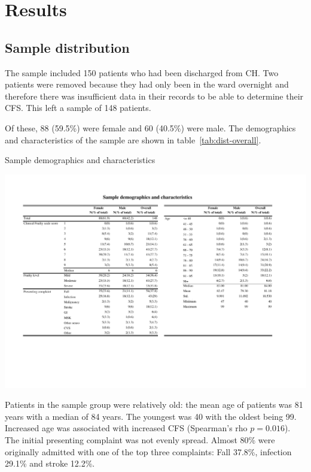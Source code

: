 \documentclass
[
	12pt,
	a4paper,
	oneside,
]{report}
\begin{document}
\chapter{Results}

\section{Sample distribution}

The sample included 150 patients who had been discharged from CH. Two patients
were removed because they had only been in the ward overnight and therefore
there was insufficient data in their records to be able to determine their
CFS. This left a sample of 148 patients. 

Of these, 88 (59.5\%) were female and 60 (40.5\%) were male. The demographics 
and characteristics of the sample are shown in table~\ref{tab:dist-overall}.

\begin{table}[p]
\centering
\caption{Sample demographics and characteristics}
\label{tab:dist-overall}
\includegraphics[width=\textwidth,
	trim={1.5cm 4cm 2.5cm 2cm},
	clip,
	angle=90,
	scale=1.45]{media/dist-overall}
\end{table}

Patients in the sample group were relatively old: the mean age of patients was 
81 years with a median of 84 years. The youngest was 40 with the oldest being 
99. Increased age was associated with increased CFS (Spearman's rho
$p=0.016$). 
The initial presenting complaint was not evenly spread. Almost 80\% 
were originally admitted with one of the top three complaints: Fall 37.8\%, 
infection 29.1\% and stroke 12.2\%. 
\end{document}
